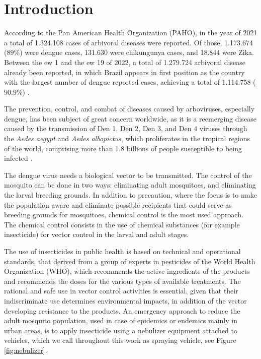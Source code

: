 \documentclass[a4paper,11pt]{article}
\begin{document}
 
\newpage
\section{Introduction}


According to the Pan American Health Organization  (PAHO), in the year of 2021 a
total  of  1.324.108  cases  of  arbivoral diseases  were  reported.  Of  those,
1.173.674 ($89\%$) were dengue cases, 131.630 were chikungunya cases, and 18.844
were  Zika. Between  the \gls{ew}  1 and  the \gls{ew}  19 of  2022, a  total of
1.279.724 arbivoral  disease already been  reported, in which Brazil  appears in
first position as the country with  the largest number of dengue reported cases,
achieving a total of 1.114.758 ($90.9\%$) \citep{paho-1}.

The  prevention,  control,  and  combat   of  diseases  caused  by  arboviruses,
especially  dengue, has  been subject  of great  concern worldwide,  as it  is a
reemerging disease caused by the transmission of Den  1, Den 2, Den 3, and Den 4
viruses  through  the {\em  Aedes  aegypt}  and  {\em Aedes  albopictus},  which
proliferates in  the tropical  regions of  the world,  comprising more  than 1.8
billions of people susceptible to being infected \citep{negreiros-2020}.

The dengue virus needs a biological vector to be transmitted. The control of the
mosquito can be done in two  ways: eliminating adult mosquitoes, and eliminating
the larval  breeding grounds. In addition  to precaution, where the  focus is to
make the population aware and eliminate  possible recipients that could serve as
breeding grounds for mosquitoes, chemical control is the most used approach. The
chemical  control  consists in  the  use  of  chemical substances  (for  example
insecticide) for vector control in the larval and adult stages.

The use of  insecticides in public health is based  on technical and operational
standards,  that derived  from a  group of  experts in  pesticides of  the World
Health  Organization  (WHO), which  recommends  the  active ingredients  of  the
products and recommends the doses for the various types of available treatments.
The rational and safe use in  vector control activities is essential, given that
their indiscriminate  use determines environmental  impacts, in addition  of the
vector developing  resistance to the  products. An emergency approach  to reduce
the adult mosquito  population, used in case of epidemics  or endemics mainly in
urban areas,  is to apply  insecticide using  a nebulizer equipment  attached to
vehicles, which  we call throughout  this work  as spraying vehicle,  see Figure
\ref{fig:nebulizer}.
\end{document}
